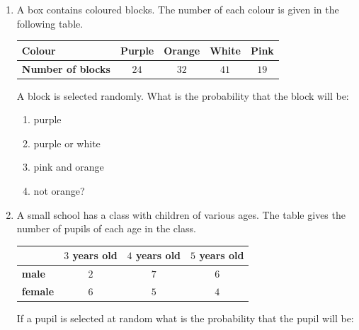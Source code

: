 \begin{exercises}{}
{
\begin{enumerate}[itemsep=6pt, label=\textbf{\arabic*}. ] 
  \item A box contains coloured blocks. The number of each colour is
    given in the following table.

    \begin{center}
      \begin{tabular}{|l|c|c|c|c|}
        \hline
        \textbf{Colour} & Purple & Orange & White & Pink \\ \hline
       
        \textbf{Number of blocks} & $24$ & $32$ & $41$ & $19$ \\ \hline
   
      \end{tabular}
    \end{center}
   A block is selected randomly. What is the probability that the block will be:
  \begin{enumerate}[noitemsep, label=\textbf{(\alph*)} ]
    \item purple
    \item purple or white
    \item pink and orange
    \item not orange?
    \end{enumerate}

  \item A small school has a class with children of various ages. The
    table gives the number of pupils of each age in the class.

    \begin{center}
      \begin{tabular}{|l|c|c|c|}
        \hline
               & $3$ years old & $4$ years old & $5$ years old \\\hline
   
        \textbf{male}   & $2$ & $7$ & $6$ \\\hline
        \textbf{female} & $6$ & $5$ & $4$ \\\hline
       
      \end{tabular}
    \end{center}

    If a pupil is selected at random what is the probability that the
    pupil will be:
  \begin{enumerate}[noitemsep, label=\textbf{(\alph*)} ]


\end{enumerate}
\end{enumerate}}
\end{exercises}
